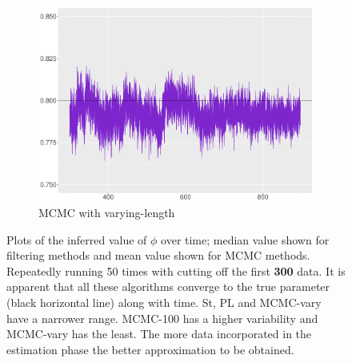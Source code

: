 \begin{figure}[h!]
\begin{subfigure}[t]{0.46\textwidth}
\includegraphics[width=\textwidth]{Chapters/04Filtering/plot/MCMCchainVary.pdf}
 \caption{MCMC with varying-length}
   \end{subfigure}
\caption{Plots of the inferred value of $\phi$ over time; median value shown for filtering methods and mean value shown for MCMC methods. Repeatedly running 50 times with cutting off the first \textbf{300} data. It is apparent that all these algorithms converge to the true parameter (black horizontal line) along with time. St, PL and MCMC-vary have a narrower range. MCMC-100 has a higher variability and MCMC-vary has the least. The more data incorporated in the estimation phase the better approximation to be obtained. }\label{FilterRiewComparesion01}
\end{figure}


